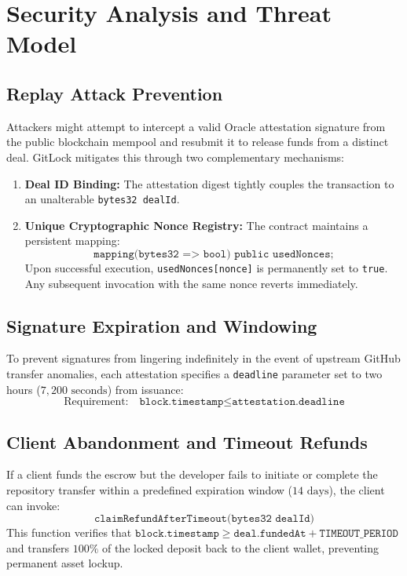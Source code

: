 \documentclass[11pt,a4paper]{article}
\begin{document}
\section{Security Analysis and Threat Model}
\subsection{Replay Attack Prevention}
Attackers might attempt to intercept a valid Oracle attestation signature from the public blockchain mempool and resubmit it to release funds from a distinct deal. GitLock mitigates this through two complementary mechanisms:
\begin{enumerate}[noitemsep]
    \item \textbf{Deal ID Binding:} The attestation digest tightly couples the transaction to an unalterable \texttt{bytes32 dealId}.
    \item \textbf{Unique Cryptographic Nonce Registry:} The contract maintains a persistent mapping:
    \begin{equation}
        \texttt{mapping(bytes32 => bool) public usedNonces;}
    \end{equation}
    Upon successful execution, \texttt{usedNonces[nonce]} is permanently set to \texttt{true}. Any subsequent invocation with the same nonce reverts immediately.
\end{enumerate}

\subsection{Signature Expiration and Windowing}
To prevent signatures from lingering indefinitely in the event of upstream GitHub transfer anomalies, each attestation specifies a \texttt{deadline} parameter set to two hours ($7,200\text{ seconds}$) from issuance:
\begin{equation}
    \text{Requirement:} \quad \texttt{block.timestamp} \le \texttt{attestation.deadline}
\end{equation}

\subsection{Client Abandonment and Timeout Refunds}
If a client funds the escrow but the developer fails to initiate or complete the repository transfer within a predefined expiration window ($14\text{ days}$), the client can invoke:
\begin{equation}
    \texttt{claimRefundAfterTimeout(bytes32 dealId)}
\end{equation}
This function verifies that $\texttt{block.timestamp} \ge \texttt{deal.fundedAt} + \texttt{TIMEOUT\_PERIOD}$ and transfers $100\%$ of the locked deposit back to the client wallet, preventing permanent asset lockup.
\end{document}
